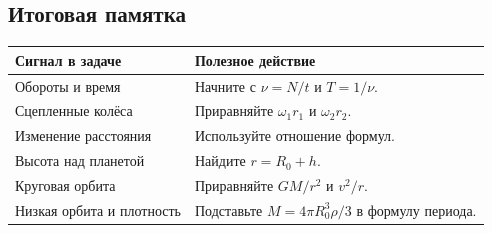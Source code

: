 \documentclass[a4paper,12pt]{article}
\begin{document}
\subsection*{Итоговая памятка}
\begin{center}
\renewcommand{\arraystretch}{1.35}
\begin{tabularx}{\linewidth}{@{}l X@{}}
\toprule Сигнал в задаче & Полезное действие\\\midrule
Обороты и время & Начните с $\nu=N/t$ и $T=1/\nu$.\\
Сцепленные колёса & Приравняйте $\omega_1r_1$ и $\omega_2r_2$.\\
Изменение расстояния & Используйте отношение формул.\\
Высота над планетой & Найдите $r=R_0+h$.\\
Круговая орбита & Приравняйте $GM/r^2$ и $v^2/r$.\\
Низкая орбита и плотность & Подставьте $M=4\pi R_0^3\rho/3$ в формулу периода.\\\bottomrule
\end{tabularx}
\end{center}
\end{document}
